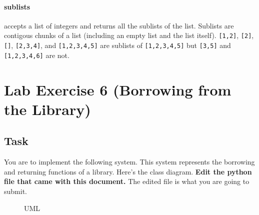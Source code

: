 \begin{Shaded}
\begin{Highlighting}[]
\NormalTok{ sortedIntegers(l:[}\NormalTok{]) }\OperatorTok{{-}\textgreater{}} \NormalTok{[}\NormalTok{]:}
\end{Highlighting}
\end{Shaded}

\subsubsection{sublists}\label{lab-exercise-5-snakes.md__sublists}

accepts a list of integers and returns all the sublists of the list.
Sublists are contigous chunks of a list (including an empty list and the
list itself). \texttt{{[}1,2{]}}, \texttt{{[}2{]}}, \texttt{{[}{]}},
\texttt{{[}2,3,4{]}}, and \texttt{{[}1,2,3,4,5{]}} are sublists of
\texttt{{[}1,2,3,4,5{]}} but \texttt{{[}3,5{]}} and
\texttt{{[}1,2,3,4,6{]}} are not.

\begin{Shaded}
\begin{Highlighting}[]
\NormalTok{[}\NormalTok{]) }\OperatorTok{{-}\textgreater{}} \NormalTok{[}\NormalTok{[}\NormalTok{]]:}
\end{Highlighting}
\end{Shaded}

\chapter{Lab Exercise 6 (Borrowing from the
Library)}\label{lab-exercise-6-borrowing-from-the-library.md__lab-exercise-6-borrowing-from-the-library}

\section{Task}\label{lab-exercise-6-borrowing-from-the-library.md__task}

You are to implement the following system. This system represents the
borrowing and returning functions of a library. Here's the class
diagram. \textbf{Edit the python file that came with this document.} The
edited file is what you are going to submit.

\begin{figure}
\centering
{}
\caption{UML}
\end{figure}

